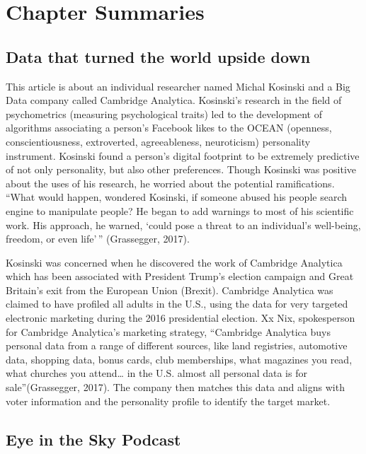 \documentclass[]{book}
\begin{document}
\hypertarget{chapter-summaries-3}{%
\section{Chapter Summaries}\label{chapter-summaries-3}}

\hypertarget{data-that-turned-the-world-upside-down}{%
\subsection{Data that turned the world upside down}\label{data-that-turned-the-world-upside-down}}

This article is about an individual researcher named Michal Kosinski and a Big Data company called Cambridge Analytica. Kosinski's research in the field of psychometrics (measuring psychological traits) led to the development of algorithms associating a person's Facebook likes to the OCEAN (openness, conscientiousness, extroverted, agreeableness, neuroticism) personality instrument. Kosinski found a person's digital footprint to be extremely predictive of not only personality, but also other preferences. Though Kosinski was positive about the uses of his research, he worried about the potential ramifications. ``What would happen, wondered Kosinski, if someone abused his people search engine to manipulate people? He began to add warnings to most of his scientific work. His approach, he warned, `could pose a threat to an individual's well-being, freedom, or even life'\,'' (Grassegger, 2017).

Kosinski was concerned when he discovered the work of Cambridge Analytica which has been associated with President Trump's election campaign and Great Britain's exit from the European Union (Brexit). Cambridge Analytica was claimed to have profiled all adults in the U.S., using the data for very targeted electronic marketing during the 2016 presidential election. Xx Nix, spokesperson for Cambridge Analytica's marketing strategy, ``Cambridge Analytica buys personal data from a range of different sources, like land registries, automotive data, shopping data, bonus cards, club memberships, what magazines you read, what churches you attend\ldots{} in the U.S. almost all personal data is for sale''(Grassegger, 2017). The company then matches this data and aligns with voter information and the personality profile to identify the target market.

\hypertarget{eye-in-the-sky-podcast}{%
\subsection{Eye in the Sky Podcast}\label{eye-in-the-sky-podcast}}
\end{document}
